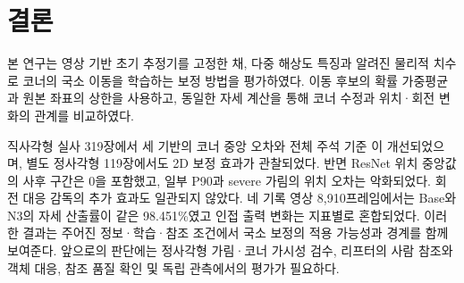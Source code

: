 \section{결론}\label{sec:conclusion}
본 연구는 영상 기반 초기 추정기를 고정한 채, 다중 해상도 특징과 알려진 물리적 치수로 코너의 국소 이동을 학습하는 보정 방법을 평가하였다. 이동 후보의 확률 가중평균과 원본 좌표의 상한을 사용하고, 동일한 자세 계산을 통해 코너 수정과 위치·회전 변화의 관계를 비교하였다.

직사각형 실사 319장에서 세 기반의 코너 중앙 오차와 전체 주석 기준 \pckten 이 개선되었으며, 별도 정사각형 119장에서도 2D 보정 효과가 관찰되었다. 반면 ResNet 위치 중앙값의 사후 구간은 0을 포함했고, 일부 P90과 severe 가림의 위치 오차는 악화되었다. 회전 대응 감독의 추가 효과도 일관되지 않았다. 네 기록 영상 8,910프레임에서는 Base와 N3의 자세 산출률이 같은 98.451\%였고 인접 출력 변화는 지표별로 혼합되었다. 이러한 결과는 주어진 정보·학습·참조 조건에서 국소 보정의 적용 가능성과 경계를 함께 보여준다. 앞으로의 판단에는 정사각형 가림·코너 가시성 검수, 리프터의 사람 참조와 객체 대응, 참조 품질 확인 및 독립 관측에서의 평가가 필요하다.
